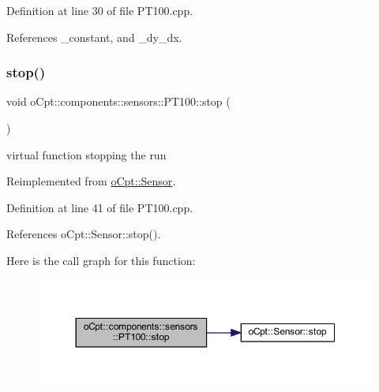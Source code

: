 Definition at line 30 of file P\+T100.\+cpp.



References \+\_\+constant, and \+\_\+dy\+\_\+dx.

\hypertarget{classo_cpt_1_1components_1_1sensors_1_1_p_t100_a6d80e18a58cf4e1b9b6ce82b441209e2}{}\label{classo_cpt_1_1components_1_1sensors_1_1_p_t100_a6d80e18a58cf4e1b9b6ce82b441209e2} 
\subsubsection{\texorpdfstring{stop()}{stop()}}
{\footnotesize\ttfamily void o\+Cpt\+::components\+::sensors\+::\+P\+T100\+::stop (\begin{DoxyParamCaption}{ }\end{DoxyParamCaption})\hspace{0.3cm}{\ttfamily [virtual]}}

virtual function stopping the run 

Reimplemented from \hyperlink{classo_cpt_1_1_sensor_a44ad78c2c091ca9cf72295293f8c5b74}{o\+Cpt\+::\+Sensor}.



Definition at line 41 of file P\+T100.\+cpp.



References o\+Cpt\+::\+Sensor\+::stop().

Here is the call graph for this function\+:\nopagebreak
\begin{figure}[H]
\begin{center}
\leavevmode
\includegraphics[width=350pt]{classo_cpt_1_1components_1_1sensors_1_1_p_t100_a6d80e18a58cf4e1b9b6ce82b441209e2_cgraph}
\end{center}
\end{figure}
\hypertarget{classo_cpt_1_1components_1_1sensors_1_1_p_t100_a66619675288a5344a55242d9bf097aee}{}\label{classo_cpt_1_1components_1_1sensors_1_1_p_t100_a66619675288a5344a55242d9bf097aee} 
